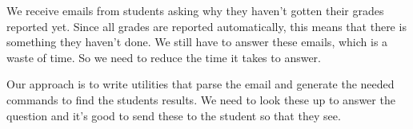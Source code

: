 We receive emails from students asking why they haven't gotten their grades 
reported yet.
Since all grades are reported automatically, this means that there is something 
they haven't done.
We still have to answer these emails, which is a waste of time.
So we need to reduce the time it takes to answer.

Our approach is to write utilities that parse the email and generate the needed 
commands to find the students results.
We need to look these up to answer the question and it's good to send these to 
the student so that they see.
